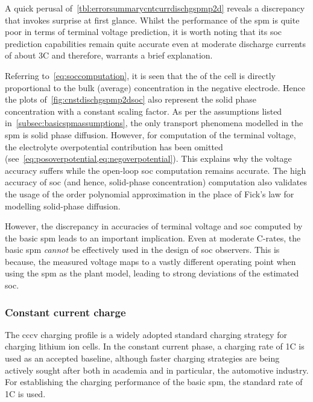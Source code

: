 

A   quick   perusal  of~\cref{tbl:errorsummarycntcurrdischgspmp2d}   reveals   a
discrepancy that invokes surprise at first glance. Whilst the performance of the
\gls{spm} is  quite poor in  terms of terminal  voltage prediction, it  is worth
noting that its \gls{soc} prediction  capabilities remain quite accurate even at
moderate  discharge  currents  of  about  3C and  therefore,  warrants  a  brief
explanation.

Referring to~\cref{eq:soccomputation}, it is  seen that the  of
the cell  is directly proportional  to the  bulk (average) concentration  in the
negative  electrode.  Hence  the  plots  of~\cref{fig:cnstdischgspmp2dsoc}  also
represent the solid  phase concentration with a constant scaling  factor. As per
the assumptions listed  in~\cref{subsec:basicspmassumptions}, the only transport
phenomena  modelled in  the \gls{spm}  is  solid phase  diffusion. However,  for
computation of the terminal  voltage, the electrolyte overpotential contribution
has  been   omitted  (see~\cref{eq:posoverpotential,eq:negoverpotential}).  This
explains  why  the  voltage  accuracy  suffers  while  the  open-loop  \gls{soc}
computation  remains  accurate.  The  high accuracy  of  \gls{soc}  (and  hence,
solid-phase  concentration)   computation  also  validates  the   usage  of  the
 order polynomial  approximation in the place of  Fick's law for
modelling solid-phase diffusion.

However,  the  discrepancy  in  accuracies of  terminal  voltage  and  \gls{soc}
computed  by the  basic \gls{spm}  leads to  an important  implication. Even  at
moderate C-rates, the  basic \gls{spm} \emph{cannot} be effectively  used in the
design of \gls{soc}  observers. This is because, the measured  voltage maps to a
vastly different  operating point when using  the \gls{spm} as the  plant model,
leading to strong deviations of the estimated \gls{soc}.


\subsubsection*{Constant current charge}\label{subsubsec:cnstcurrchgsim}

The \gls{cccv} charging  profile is a widely adopted  standard charging strategy
for charging lithium  ion cells. In the constant current  phase, a charging rate
of 1C is  used as an accepted baseline, although  faster charging strategies are
being actively sought  after both in academia and in  particular, the automotive
industry. For establishing the charging performance of the basic \gls{spm}, the
standard rate of 1C is used.

